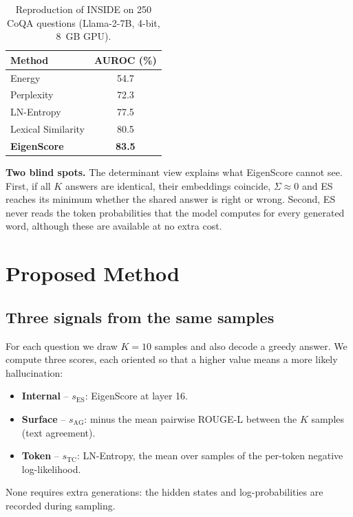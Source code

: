 \documentclass[journal]{IEEEtran}
\begin{document}
\begin{table}[t]
\centering
\caption{Reproduction of INSIDE on 250 CoQA questions (Llama-2-7B, 4-bit, 8~GB GPU).}
\label{tab:repro}
\footnotesize
\begin{tabular}{@{}lc@{}}
\toprule
Method & AUROC (\%) \\
\midrule
Energy & 54.7 \\
Perplexity & 72.3 \\
LN-Entropy & 77.5 \\
Lexical Similarity & 80.5 \\
\textbf{EigenScore}~\cite{chen2024inside} & \textbf{83.5} \\
\bottomrule
\end{tabular}
\end{table}

\textbf{Two blind spots.} The determinant view explains what EigenScore cannot see. First, if all $K$ answers are identical, their embeddings coincide, $\Sigma\approx 0$ and ES reaches its minimum whether the shared answer is right or wrong. Second, ES never reads the token probabilities that the model computes for every generated word, although these are available at no extra cost.

\section{Proposed Method}
\subsection{Three signals from the same samples}
For each question we draw $K=10$ samples and also decode a greedy answer. We compute three scores, each oriented so that a higher value means a more likely hallucination:
\begin{itemize}
\item \textbf{Internal} -- $s_{\mathrm{ES}}$: EigenScore at layer 16.
\item \textbf{Surface} -- $s_{\mathrm{AG}}$: minus the mean pairwise ROUGE-L between the $K$ samples (text agreement).
\item \textbf{Token} -- $s_{\mathrm{TC}}$: LN-Entropy, the mean over samples of the per-token negative log-likelihood.
\end{itemize}
None requires extra generations: the hidden states and log-probabilities are recorded during sampling.
\end{document}

